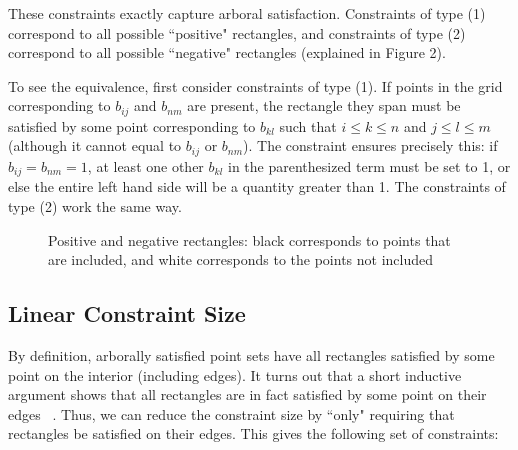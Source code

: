 \documentclass[11pt]{article}
\begin{document}
These constraints exactly capture arboral satisfaction. Constraints of type (1) correspond to all possible ``positive" rectangles, and constraints of type (2) correspond to all possible ``negative" rectangles (explained in Figure 2).

To see the equivalence, first consider constraints of type (1). If points in the grid corresponding to $b_{ij}$ and $b_{nm}$ are present, the rectangle they span must be satisfied by some point corresponding to $b_{kl}$ such that   $i\leq k \leq n$ and $j \leq l \leq m$ (although it cannot equal to $b_{ij}$ or $b_{nm}$). The constraint ensures precisely this: if $b_{ij} = b_{nm} = 1$, at least one other $b_{kl}$ in the parenthesized term must be set to 1, or else the entire left hand side will be a quantity greater than 1. The constraints of type (2) work the same way.

\begin{figure}
\centering
{}
\caption{Positive and negative rectangles: black corresponds to points that are included, and white corresponds to the points not included}
\label{fig:rectangles}
\end{figure}

\subsection{Linear Constraint Size}

By definition, arborally satisfied point sets have all rectangles satisfied by some point on the interior (including edges). It turns out that a short inductive argument shows that all rectangles are in fact satisfied by some point on their edges ~\cite{geometryBST}. Thus, we can reduce the constraint size by ``only" requiring that rectangles be satisfied on their edges. This gives the following set of constraints: 
\end{document}
